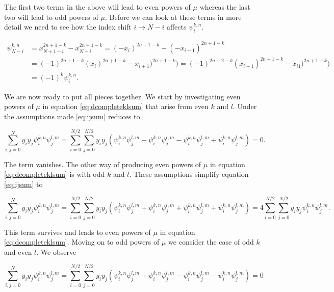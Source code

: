 \documentclass[apj]{emulateapj}
\begin{document}
The first two terms in the above will lead to even powers of $\mu$ whereas the last two will lead to odd powers of $\mu$. Before we can look at these terms in more detail we need to see how the index shift $i \to N-i$ affects $\psi_{i}^{k, n}$.

\begin{equation}
\begin{aligned}
\psi_{N-i}^{k,n} &= x_{N+1-i}^{2n+1-k} - x_{N-i}^{2n+1-k} = (-x_{i})^{2n+1-k} - (-x_{i+1})^{2n+1-k}\\
&= (-1)^{2n+1-k} (x_{i})^{2n+1-k} - x_{i+1})^{2n+1-k} ) = (-1)^{2n+2-k} (x_{i+1})^{2n+1-k} - x_{i1})^{2n+1-k} )\\
&= (-1)^{k} \psi_{i}^{k,n}.
\end{aligned}
\end{equation}

We are now ready to put all pieces together. We start by investigating even powers of $\mu$ in equation \ref{eq:dcompleteklsum} that arise from even $k$ and $l$. Under the assumptions made \ref{eq:ijsum} reduces to

\begin{equation}
\sum_{i,j = 0}^N y_i y_j \psi_i^{k, n} \psi_j^{l, m} = \sum_{i = 0}^{N/2}\sum_{j = 0}^{N/2} y_i y_j  \left( \psi_i^{k, n} \psi_j^{l, m} - \psi_{i}^{k, n} \psi_j^{l, m} - \psi_i^{k, n} \psi_{j}^{l, m} + \psi_{i}^{k, n} \psi_{j}^{l, m} \right) = 0.
\end{equation}

The term vanishes. The other way of producing even powers of $\mu$ in equation \ref{eq:dcompleteklsum} is with odd $k$ and $l$. These assumptions simplify equation \ref{eq:ijsum} to

\begin{equation}
\sum_{i,j = 0}^N y_i y_j \psi_i^{k, n} \psi_j^{l, m} = \sum_{i = 0}^{N/2}\sum_{j = 0}^{N/2} y_i y_j \left( \psi_i^{k, n} \psi_j^{l, m} + \psi_{i}^{k, n} \psi_j^{l, m} + \psi_i^{k, n} \psi_{j}^{l, m} + \psi_{i}^{k, n} \psi_{j}^{l, m} \right) = 4 \sum_{i = 0}^{N/2}\sum_{j = 0}^{N/2} y_i y_j \psi_i^{k, n} \psi_j^{l, m}.
\end{equation}

This term survives and leads to even powers of $\mu$ in equation \ref{eq:dcompleteklsum}. Moving on to odd powers of $\mu$ we consider the case of odd $k$ and even $l$. We observe

\begin{equation}
\sum_{i,j = 0}^N y_i y_j \psi_i^{k, n} \psi_j^{l, m} = \sum_{i = 0}^{N/2}\sum_{j = 0}^{N/2} y_i y_j \left( \psi_i^{k, n} \psi_j^{l, m} + \psi_{i}^{k, n} \psi_j^{l, m} - \psi_i^{k, n} \psi_{j}^{l, m} - \psi_{i}^{k, n} \psi_{j}^{l, m} \right) = 0
\end{equation}
\end{document}
